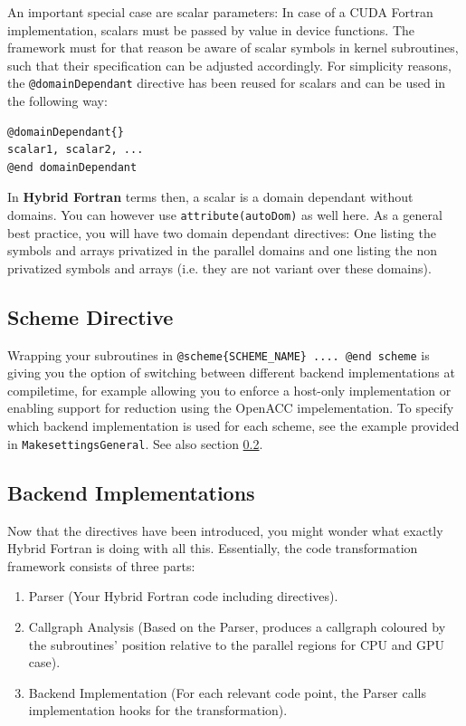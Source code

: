 An important special case are scalar parameters: In case of a CUDA Fortran implementation, scalars must be passed by value in device functions. The framework must for that reason be aware of scalar symbols in kernel subroutines, such that their specification can be adjusted accordingly. For simplicity reasons, the \verb|@domainDependant| directive has been reused for scalars and can be used in the following way:

\begin{lstlisting}[name=domainDependantScalar, label=listing:domainDependantScalar, caption={Domain dependant directive syntax for scalars.}]
@domainDependant{}
scalar1, scalar2, ...
@end domainDependant
\end{lstlisting}

In \textbf{Hybrid Fortran} terms then, a scalar is a domain dependant without domains. You can however use \verb|attribute(autoDom)| as well here. As a general best practice, you will have two domain dependant directives: One listing the symbols and arrays privatized in the parallel domains and one listing the non privatized symbols and arrays (i.e. they are not variant over these domains).

\subsection{Scheme Directive}

Wrapping your subroutines in \verb|@scheme{SCHEME_NAME} .... @end scheme| is giving you the option of switching between different backend implementations at compiletime, for example allowing you to enforce a host-only implementation or enabling support for reduction using the OpenACC impelementation. To specify which backend implementation is used for each scheme, see the example provided in \verb|MakesettingsGeneral|. See also section \ref{sub:backendImplementation}.

\subsection{Backend Implementations} \label{sub:backendImplementation}

 Now that the directives have been introduced, you might wonder what exactly Hybrid Fortran is doing with all this. Essentially, the code transformation framework consists of three parts:

 \begin{enumerate}
  \item Parser (Your Hybrid Fortran code including directives).
  \item Callgraph Analysis (Based on the Parser, produces a callgraph coloured by the subroutines' position relative to the parallel regions for CPU and GPU case).
  \item Backend Implementation (For each relevant code point, the Parser calls implementation hooks for the transformation).
 \end{enumerate}

